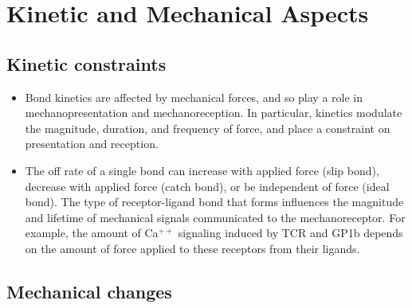 \documentclass[
10pt, %
letterpaper, %
twocolumn, %
landscape %
]{article}
\begin{document}

\section{Kinetic and Mechanical Aspects}
\label{sec:kinet-mech-aspects}

\subsection{Kinetic constraints}
\label{sec:kinetic-constraints}

\begin{itemize}
\item Bond kinetics are affected by mechanical forces, and so play a
  role in mechanopresentation and mechanoreception. In particular,
  kinetics modulate the magnitude, duration, and frequency of force,
  and place a constraint on presentation and reception.
\item The off rate of a single bond can increase with applied force
  (slip bond), decrease with applied force (catch bond), or be
  independent of force (ideal bond). The type of receptor-ligand bond
  that forms influences the magnitude and lifetime of mechanical
  signals communicated to the mechanoreceptor. For example, the amount
  of Ca$^{++}$ signaling induced by TCR and GP1b depends on the amount
  of force applied to these receptors from their ligands.
\end{itemize}

\subsection{Mechanical changes}
\label{sec:mechanical-changes}
\end{document}
